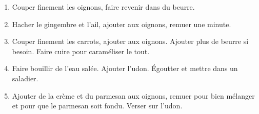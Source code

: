 
\begin{ingredients}
\end{ingredients}


\begin{recipe}
  \begin{enumerate}

  \item Couper finement les oignons, faire revenir dans du beurre.
    
  \item Hacher le gingembre et l'ail, ajouter aux oignons, remuer une minute.
    
  \item Couper finement les carrots, ajouter aux oignons.  Ajouter
    plus de beurre si besoin.  Faire cuire pour caraméliser le tout.
    
  \item Faire bouillir de l'eau salée.  Ajouter l'udon.  Égoutter et mettre dans un saladier.
    
  \item Ajouter de la crème et du parmesan aux oignons, remuer pour
    bien mélanger et pour que le parmesan soit fondu.  Verser sur
    l'udon.

  \end{enumerate}
\end{recipe}

